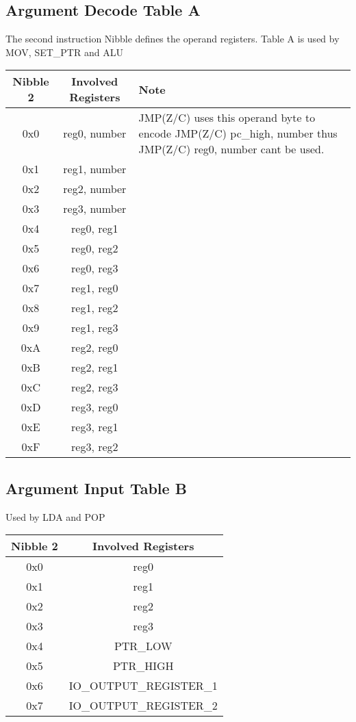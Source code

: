 \documentclass[a4paper, 12pt]{article}
\begin{document}
	\subsection{Argument Decode Table A}
 The second instruction Nibble defines the operand registers.
Table A is used by MOV, SET\_PTR and ALU
	\begin{center}
		\begin{tabular}{|c|c|p{6cm}|}
			\hline
			Nibble 2 & Involved Registers & Note \\ \hline
			0x0 & reg0, number & JMP(Z/C) uses this operand byte to encode JMP(Z/C) pc\_high, number thus JMP(Z/C) reg0, number cant be used. \\ \hline
			0x1 & reg1, number & \\ \hline
			0x2 & reg2, number & \\ \hline
			0x3 & reg3, number & \\ \hline
			0x4 & reg0, reg1 & \\ \hline
			0x5 & reg0, reg2 & \\ \hline
			0x6 & reg0, reg3 & \\ \hline
			0x7 & reg1, reg0 & \\ \hline
			0x8 & reg1, reg2 & \\ \hline
			0x9 & reg1, reg3 & \\ \hline
			0xA & reg2, reg0 & \\ \hline
			0xB & reg2, reg1 & \\ \hline
			0xC & reg2, reg3 & \\ \hline
			0xD & reg3, reg0 & \\ \hline
			0xE & reg3, reg1 & \\ \hline
			0xF & reg3, reg2 & \\ \hline
		\end{tabular}
	\end{center}	
	\newpage
	\subsection{Argument Input Table B}
	Used by LDA and POP
	\begin{center}
		\begin{tabular}{|c|c|}
			\hline
			Nibble 2 & Involved Registers \\ \hline
			0x0 & reg0 \\ \hline
			0x1 & reg1 \\ \hline
			0x2 & reg2 \\ \hline
			0x3 & reg3 \\ \hline
			0x4 & PTR\_LOW \\ \hline
			0x5 & PTR\_HIGH \\ \hline
			0x6 & IO\_OUTPUT\_REGISTER\_1 \\ \hline
			0x7 & IO\_OUTPUT\_REGISTER\_2 \\ \hline
		\end{tabular}
	\end{center}	
\end{document}
